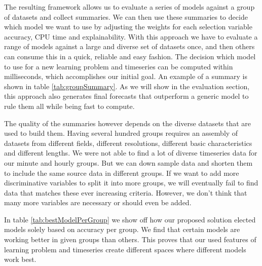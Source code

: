 The resulting framework allows us to evaluate a series of models against a group of datasets and collect summaries. We can then use these summaries to decide which model we want to use by adjusting the weights for each selection variable accuracy, CPU time and explainability. With this approach we have to evaluate a range of models against a large and diverse set of datasets once, and then others can consume this in a quick, reliable and easy fashion. The decision which model to use for a new learning problem and timeseries can be computed within milliseconds, which accomplishes our initial goal. An example of a summary is shown in table \ref{tab:groupSummary}. As we will show in the evaluation section, this approach also generates final forecasts that outperform a generic model to rule them all while being fast to compute.

The quality of the summaries however depends on the diverse datasets that are used to build them. Having several hundred groups requires an assembly of datasets from different fields, different resolutions, different basic characteristics and different lengths. We were not able to find a lot of diverse timeseries data for our minute and hourly groups. But we can down sample data and shorten them to include the same source data in different groups. If we want to add more discriminative variables to split it into more groups, we will eventually fail to find data that matches these ever increasing criteria. However, we don't think that many more variables are necessary or should even be added.

In table \ref{tab:bestModelPerGroup} we show off how our proposed solution elected models solely based on accuracy per group. We find that certain models are working better in given groups than others. This proves that our used features of learning problem and timeseries create different spaces where different models work best.


